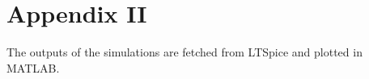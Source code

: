 \documentclass[letterpaper,12pt]{article}
\begin{document}
\section*{Appendix II}
The outputs of the simulations are fetched from LTSpice and plotted in MATLAB.



\end{document}
